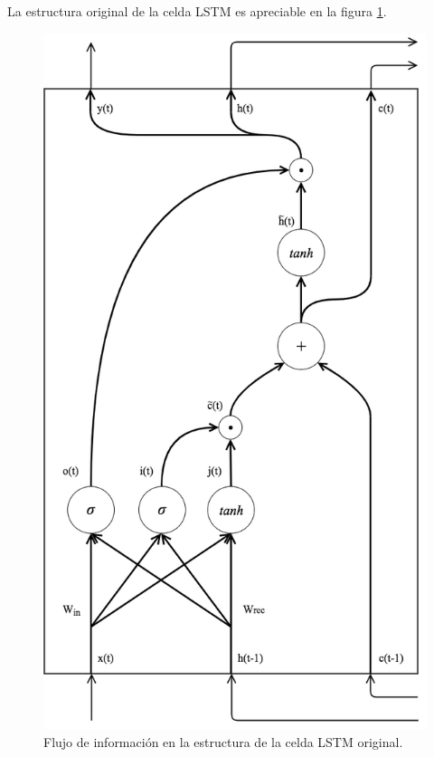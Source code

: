 \documentclass{article}
\begin{document}
	La estructura original de la celda LSTM es apreciable en la figura \ref{formerLSTM}.
	\begin{figure}[H]
		\centering
		\includegraphics[scale=0.2]{formerLSTM.png}
		\caption{Flujo de información en la estructura de la celda LSTM original.}
		\label{formerLSTM}
	\end{figure}
	
\end{document}
